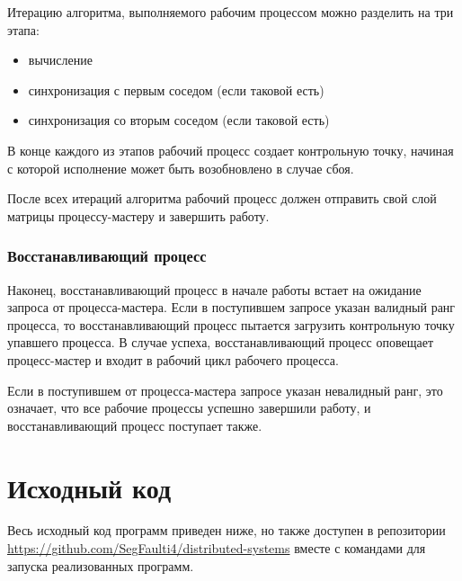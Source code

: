 \documentclass[a4paper]{article}
\begin{document}
Итерацию алгоритма, выполняемого рабочим процессом можно разделить на три этапа:

\begin{itemize}
    \item вычисление
    \item синхронизация с первым соседом (если таковой есть)
    \item синхронизация со вторым соседом (если таковой есть)
\end{itemize}

В конце каждого из этапов рабочий процесс создает контрольную точку, начиная с которой исполнение может быть возобновлено в случае сбоя. 

После всех итераций алгоритма рабочий процесс должен отправить свой слой матрицы процессу-мастеру и завершить работу.

\subsubsection{Восстанавливающий процесс}

Наконец, восстанавливающий процесс в начале работы встает на ожидание запроса от процесса-мастера. Если в поступившем запросе указан валидный ранг процесса, то восстанавливающий процесс пытается загрузить контрольную точку упавшего процесса. В случае успеха, восстанавливающий процесс оповещает процесс-мастер и входит в рабочий цикл рабочего процесса.

Если в поступившем от процесса-мастера запросе указан невалидный ранг, это означает, что все рабочие процессы успешно завершили работу, и восстанавливающий процесс поступает также.

\newpage

\section{Исходный код}

Весь исходный код программ приведен ниже, но также доступен в репозитории \url{https://github.com/SegFaulti4/distributed-systems} вместе с командами для запуска реализованных программ.

\end{document}
